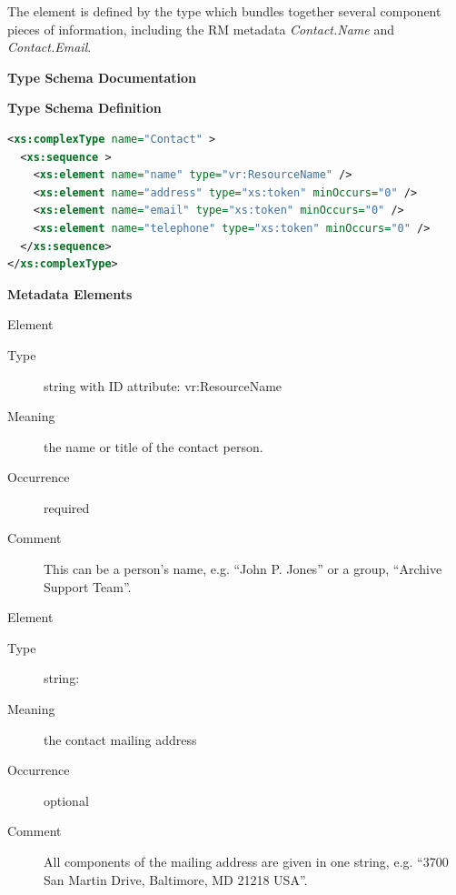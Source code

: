 \documentclass[11pt,a4paper]{ivoa}
\begin{document}



The  element is defined by the
 type which bundles together several component
pieces of information, including the RM metadata \emph{Contact.Name}
and \emph{Contact.Email}.  



\begin{generated}
\begingroup
      	\renewcommand*\descriptionlabel[1]{%
      	\hbox to 5.5em{\emph{#1}\hfil}}\vspace{2ex}\noindent\textbf{ Type Schema Documentation}


\vspace{1ex}\noindent\textbf{ Type Schema Definition}

\begin{lstlisting}[language=XML,basicstyle=\footnotesize]
<xs:complexType name="Contact" >
  <xs:sequence >
    <xs:element name="name" type="vr:ResourceName" />
    <xs:element name="address" type="xs:token" minOccurs="0" />
    <xs:element name="email" type="xs:token" minOccurs="0" />
    <xs:element name="telephone" type="xs:token" minOccurs="0" />
  </xs:sequence>
</xs:complexType>
\end{lstlisting}

\vspace{0.5ex}\noindent\textbf{ Metadata Elements}

\begingroup\small\begin{bigdescription}\item[Element \xmlel{name}]
\begin{description}
\item[Type] string with ID attribute: vr:ResourceName
\item[Meaning] 
                  the name or title of the contact person.
              
\item[Occurrence] required
\item[Comment] 
                  This can be a person's name, e.g. “John P. Jones” or
                  a group, “Archive Support Team”.
              

\end{description}
\item[Element \xmlel{address}]
\begin{description}
\item[Type] string: 
\item[Meaning] the contact mailing address
\item[Occurrence] optional
\item[Comment] 
                All components of the mailing address are given in one
                string, e.g. “3700 San Martin Drive, Baltimore, MD 21218 USA”.
              


\end{description}
\end{bigdescription}
\end{generated}
\end{document}
